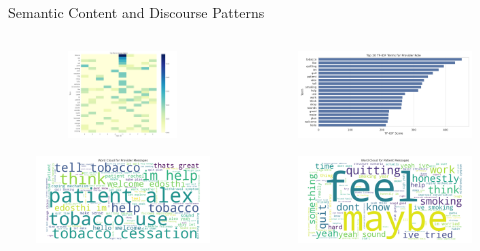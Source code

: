 \begin{frame}{Semantic Content and Discourse Patterns}
  \begin{columns}
    \begin{column}{0.33\textwidth}
      \begin{minipage}{\textwidth}
        \includegraphics[width=0.95\textwidth, height=2.3cm]{images/analysis/plots/topic_terms_heatmap.png}
      \end{minipage}
      \vspace{0.3cm}
      \begin{minipage}{\textwidth}
        \includegraphics[width=0.95\textwidth, height=2.3cm]{images/analysis/plots/wordcloud_provider.png}
      \end{minipage}
      
    \end{column}
    
    \begin{column}{0.33\textwidth}
       \begin{minipage}{\textwidth}
        \includegraphics[width=0.95\textwidth, height=2.3cm]{images/analysis/plots_advanced/tfidf_top_terms_provider.png}
      \end{minipage}
      \vspace{0.3cm}
      \begin{minipage}{\textwidth}
        \includegraphics[width=0.95\textwidth, height=2.3cm]{images/analysis/plots/wordcloud_patient.png}
      \end{minipage}
      

\end{column}
\end{columns}
\end{frame}
